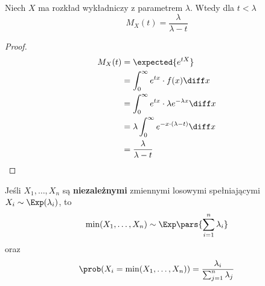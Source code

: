 \begin{theorem}[MGF]
	Niech \( X \) ma rozkład wykładniczy z parametrem \( \lambda \). Wtedy dla \( t < \lambda \)
	\[
		M_X(t) = \frac{\lambda}{\lambda - t}
	\]
\end{theorem}
\begin{proof}
	\begin{align*}
		M_X(t)
		 & = \expected{e^{tX}}                                         \\
		 & = \int_0^\infty e^{tx} \cdot f(x) \diff x                   \\
		 & = \int_0^\infty e^{tx} \cdot \lambda e^{-\lambda x} \diff x \\
		 & = \lambda \int_0^\infty e^{-x \cdot (\lambda - t)} \diff x  \\
		 & = \frac{\lambda}{\lambda - t}
	\end{align*}
\end{proof}

\begin{theorem}[Lemat 8.5 P\&C]
	\label{lemat8.5}
	Jeśli \(X_1, \dots, X_n\) są \textbf{niezależnymi} zmiennymi losowymi spełniającymi \(X_i \sim \Exp(\lambda_i)\), to
	\[
		\min(X_1, \dots, X_n) \sim \Exp\pars{\sum_{i=1}^n \lambda_i}
	\]
	oraz
	\[
		\prob(X_i = \min(X_1, \dots, X_n)) = \frac{\lambda_i}{\sum_{j=1}^n \lambda_j}
	\]
\end{theorem}

